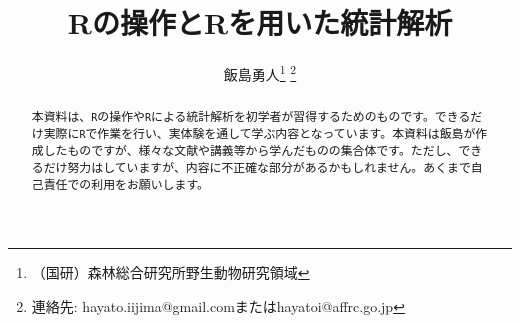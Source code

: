 \documentclass[dvipdfmx]{jsarticle}
\theoremstyle{definition}%
\begin{document}
\title{Rの操作とRを用いた統計解析}
\author{飯島勇人\footnote{（国研）森林総合研究所野生動物研究領域}
\footnote{連絡先: hayato.iijima@gmail.comまたはhayatoi@affrc.go.jp}}
\maketitle
\begin{abstract}
本資料は、\verb|R|の操作や\verb|R|による統計解析を初学者が習得するためのものです。できるだけ実際に\verb|R|で作業を行い、実体験を通して学ぶ内容となっています。本資料は飯島が作成したものですが、様々な文献や講義等から学んだものの集合体です。ただし、できるだけ努力はしていますが、内容に不正確な部分があるかもしれません。あくまで自己責任での利用をお願いします。
\end{abstract}
%
\tableofcontents






\printindex
\end{document}
